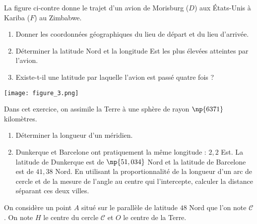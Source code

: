 \documentclass[a4paper]{article}
\begin{document}
\exo \vspace*{-2mm}

\begin{multicols}{2}
  La figure ci-contre donne le trajet d'un avion de Morisburg ($D$) aux États-Unis à Kariba ($F$) au Zimbabwe.
  \begin{enumerate}
    \item Donner les coordonnées géographiques du lieu de départ et du lieu d'arrivée.
    \item Déterminer la latitude Nord et la longitude Est les plus élevées atteintes par l'avion.
    \item Existe-t-il une latitude par laquelle l'avion est passé quatre fois ?
  \end{enumerate}

  \vspace*{0.8cm}
  \begin{center}
    \texttt{[image: figure\_3.png]}
  \end{center}
\end{multicols}

\bigskip

\exo Dans cet exercice, on assimile la Terre à une sphère de rayon $\np{6371}$ kilomètres.
\begin{enumerate}
  \item Déterminer la longueur d'un méridien.
  \item Dunkerque et Barcelone ont pratiquement la même longitude : $2,2$\degree{} Est. La latitude de Dunkerque est de $\np{51,034}$\degree{} Nord et la latitude de Barcelone est de $41,38$\degree{} Nord. En utilisant la proportionnalité de la longueur d'un arc de cercle et de la mesure de l'angle au centre qui l'intercepte, calculer la distance séparant ces deux villes.
\end{enumerate}

\bigskip

\exo \vspace*{-2mm}
On considère un point $A$ situé sur le parallèle de latitude $48$\degree{} Nord que l'on note $\mathcal{C}$. On note $H$ le centre du cercle $\mathcal{C}$ et $O$ le centre de la Terre.
\end{document}
